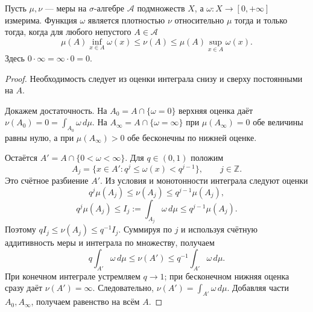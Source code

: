 \label{ticket:31}

\begin{theorem}
Пусть $\mu,\nu$ --- меры на $\sigma$-алгебре $\mathcal A$ подмножеств $X$, а $\omega:X\to[0,+\infty]$ измерима.
Функция $\omega$ является плотностью $\nu$ относительно $\mu$ тогда и только тогда, когда для любого непустого $A\in\mathcal A$
\[
  \mu(A)\inf_{x\in A}\omega(x)
  \le\nu(A)\le
  \mu(A)\sup_{x\in A}\omega(x).
\]
Здесь $0\cdot\infty=\infty\cdot0=0$.
\end{theorem}

\begin{proof}
Необходимость следует из оценки интеграла снизу и сверху постоянными на $A$.

Докажем достаточность.
На $A_0=A\cap\{\omega=0\}$ верхняя оценка даёт $\nu(A_0)=0=\int_{A_0}\omega\,d\mu$.
На $A_\infty=A\cap\{\omega=\infty\}$ при $\mu(A_\infty)=0$ обе величины равны нулю, а при $\mu(A_\infty)>0$ обе бесконечны по нижней оценке.

Остаётся $A'=A\cap\{0<\omega<\infty\}$.
Для $q\in(0,1)$ положим
\[
  A_j=\{x\in A':q^j\le\omega(x)<q^{j-1}\},\qquad j\in\mathbb Z.
\]
Это счётное разбиение $A'$.
Из условия и монотонности интеграла следуют оценки
\[
  q^j\mu(A_j)\le\nu(A_j)\le q^{j-1}\mu(A_j),
\]
\[
  q^j\mu(A_j)\le I_j:=\int_{A_j}\omega\,d\mu
  \le q^{j-1}\mu(A_j).
\]
Поэтому $qI_j\le\nu(A_j)\le q^{-1}I_j$.
Суммируя по $j$ и используя счётную аддитивность меры и интеграла по множеству, получаем
\[
  q\int_{A'}\omega\,d\mu\le\nu(A')
  \le q^{-1}\int_{A'}\omega\,d\mu.
\]
При конечном интеграле устремляем $q\to1$; при бесконечном нижняя оценка сразу даёт $\nu(A')=\infty$.
Следовательно, $\nu(A')=\int_{A'}\omega\,d\mu$.
Добавляя части $A_0,A_\infty$, получаем равенство на всём $A$.
\end{proof}
